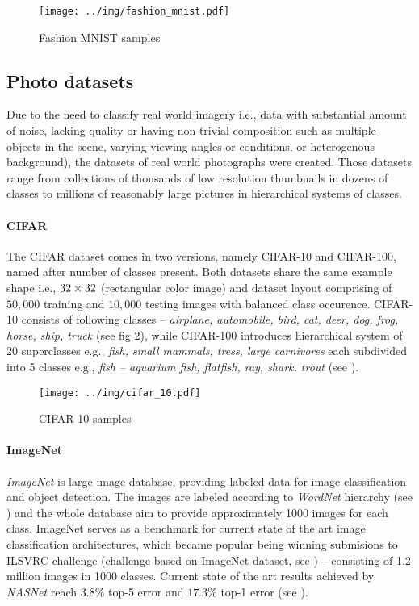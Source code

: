 \begin{figure}
    \centering
    \texttt{[image: ../img/fashion\_mnist.pdf]}
    \caption{Fashion MNIST samples}
    \label{fig:fashion_mnist}
\end{figure}

\subsection{Photo datasets}
Due to the need to classify real world imagery i.e., data with substantial amount of noise, lacking quality or having non-trivial composition such as multiple objects in the scene, varying viewing angles or conditions, or heterogenous background), the datasets of real world photographs were created. Those datasets range from collections of thousands of low resolution thumbnails in dozens of classes to millions of reasonably large pictures in hierarchical systems of classes.

\paragraph{CIFAR}

The CIFAR dataset comes in two versions, namely CIFAR-10 and CIFAR-100, named after number of classes present. Both datasets share the same example shape i.e., $32 \times 32 \time 3$ (rectangular color image) and dataset layout comprising of $50,000$ training and $10,000$ testing images with balanced class occurence. CIFAR-10 consists of following classes -- \emph{airplane, automobile, bird, cat, deer, dog, frog, horse, ship, truck} (see fig \ref{fig:cifar_10}), while CIFAR-100 introduces hierarchical system of 20 superclasses e.g., \emph{fish, small mammals, tress, large carnivores} each subdivided into 5 classes e.g., \emph{fish -- aquarium fish, flatfish, ray, shark, trout} (see \cite{Krizhevsky09learningmultiple}).

\begin{figure}
    \centering
    \texttt{[image: ../img/cifar\_10.pdf]}
    \caption{CIFAR 10 samples}
    \label{fig:cifar_10}
\end{figure}

\paragraph{ImageNet}

\emph{ImageNet} is large image database, providing labeled data for image classification and object detection. The images are labeled according to \emph{WordNet\textsuperscript{\textregistered}} hierarchy (see \cite{wordnet}) and the whole database aim to provide approximately 1000 images for each class. ImageNet serves as a benchmark for current state of the art image classification architectures, which became popular being winning submisions to ILSVRC challenge (challenge based on ImageNet dataset, see \cite{ILSVRC15}) -- consisting of 1.2 million images in 1000 classes. Current state of the art results achieved by \emph{NASNet} reach $3.8\%$ top-5 error and $17.3\%$ top-1 error (see \cite{nasnet}).

